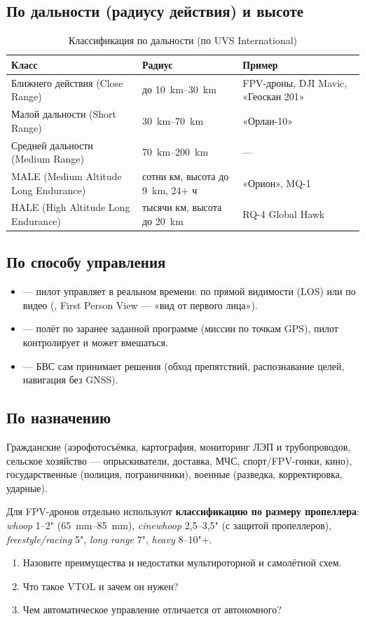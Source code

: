 \subsection{По дальности (радиусу действия) и высоте}
\begin{table}[H]\centering\small
\begin{tabularx}{\linewidth}{@{}l >{\raggedright\arraybackslash}X >{\raggedright\arraybackslash}X@{}}
\toprule
\textbf{Класс} & \textbf{Радиус} & \textbf{Пример} \\
\midrule
Ближнего действия (Close Range) & до \SIrange{10}{30}{\kilo\metre} & FPV-дроны, DJI Mavic, «Геоскан 201» \\
Малой дальности (Short Range) & \SIrange{30}{70}{\kilo\metre} & «Орлан-10»\\
Средней дальности (Medium Range) & \SIrange{70}{200}{\kilo\metre} & — \\
MALE (Medium Altitude Long Endurance) & сотни км, высота до \SI{9}{\kilo\metre}, 24+ ч & «Орион», MQ-1 \\
HALE (High Altitude Long Endurance) & тысячи км, высота до \SI{20}{\kilo\metre} & RQ-4 Global Hawk \\
\bottomrule
\end{tabularx}
\caption{Классификация по дальности (по UVS International)}
\end{table}

\subsection{По способу управления}
\begin{itemize}
\item {} — пилот управляет в реальном времени: по прямой видимости (LOS) или по видео (, First Person View — «вид от первого лица»).
\item {} — полёт по заранее заданной программе (миссии по точкам GPS), пилот контролирует и может вмешаться.
\item {} — БВС сам принимает решения (обход препятствий, распознавание целей, навигация без GNSS).
\end{itemize}

\subsection{По назначению}
Гражданские (аэрофотосъёмка, картография, мониторинг ЛЭП и трубопроводов, сельское хозяйство — опрыскиватели, доставка, МЧС, спорт/FPV-гонки, кино), государственные (полиция, пограничники), военные (разведка, корректировка, ударные). \par
Для FPV-дронов отдельно используют \textbf{классификацию по размеру пропеллера}: \emph{whoop} 1–2" (\SIrange{65}{85}{\milli\metre}), \emph{cinewhoop} 2,5–3,5" (с защитой пропеллеров), \emph{freestyle/racing} 5", \emph{long range} 7", \emph{heavy} 8–10"+.

\begin{exam}
\begin{enumerate}
\item Назовите преимущества и недостатки мультироторной и самолётной схем.
\item Что такое VTOL и зачем он нужен?
\item Чем автоматическое управление отличается от автономного?
\end{enumerate}
\end{exam}
